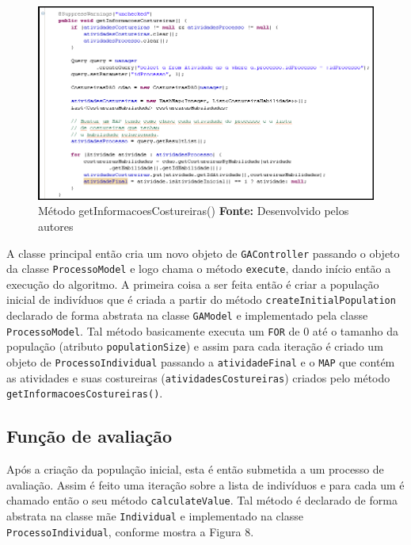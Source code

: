 \begin{figure}[h!]
	\centerline{\includegraphics[scale=0.7]{./imagens/metodo_informacoes_costureiras.png}}
	\caption[Distribuição de lotes]
	{Método getInformacoesCostureiras() \textbf{Fonte:} Desenvolvido pelos autores}
	\label{fig:exemplo1}
\end{figure}



\par A classe principal então cria um novo objeto de \texttt{GAController} passando o objeto da classe \texttt{ProcessoModel} e
logo chama o método \texttt{execute}, dando início então a execução do algoritmo. A primeira coisa a ser feita então é criar
a população inicial de indivíduos que é criada a partir do método \texttt{createInitialPopulation} declarado de forma 
abstrata na classe \texttt{GAModel} e implementado pela classe \texttt{ProcessoModel}. Tal método basicamente executa um 
\texttt{FOR} de 0 até o tamanho da população (atributo \texttt{populationSize}) e assim para cada iteração é criado um objeto de \texttt{ProcessoIndividual} passando a \texttt{atividadeFinal} e o \texttt{MAP} que contém as atividades e suas costureiras (\texttt{atividadesCostureiras}) criados pelo método \texttt{getInformacoesCostureiras()}.



\subsection{Função de avaliação}
\par Após a criação da população inicial, esta é então submetida a um processo de avaliação. Assim é feito uma iteração sobre
a lista de indivíduos e para cada um é chamado então o seu método \texttt{calculateValue}.
Tal método é declarado de forma abstrata na classe mãe \texttt{Individual} e implementado na classe \texttt{ProcessoIndividual}, 
conforme mostra a Figura 8.

